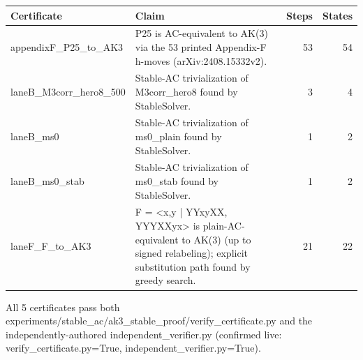 \begin{tabular}{@{}p{}p{}rr@{}}
\toprule
Certificate & Claim & Steps & States \\
\midrule
appendixF\_P25\_to\_AK3 & P25 is AC-equivalent to AK(3) via the 53 printed Appendix-F h-moves (arXiv:2408.15332v2). & 53 & 54 \\
laneB\_M3corr\_hero8\_500 & Stable-AC trivialization of M3corr\_hero8 found by StableSolver. & 3 & 4 \\
laneB\_ms0 & Stable-AC trivialization of ms0\_plain found by StableSolver. & 1 & 2 \\
laneB\_ms0\_stab & Stable-AC trivialization of ms0\_stab found by StableSolver. & 1 & 2 \\
laneF\_F\_to\_AK3 & F = \textless{}x,y | YYxyXX, YYYXXyx\textgreater{} is plain-AC-equivalent to AK(3) (up to signed relabeling); explicit substitution path found by greedy search. & 21 & 22 \\
\bottomrule
\end{tabular}

\vspace{2pt}
{\footnotesize
All 5 certificates pass both experiments/stable\_ac/ak3\_stable\_proof/verify\_certificate.py and the independently-authored independent\_verifier.py (confirmed live: verify\_certificate.py=True, independent\_verifier.py=True).\par
}
